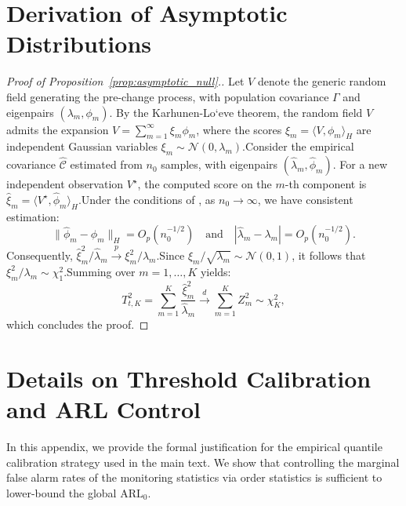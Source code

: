 \documentclass{article}
\theoremstyle{plain}
\theoremstyle{definition}
\theoremstyle{remark}
\begin{document}
\section{Derivation of Asymptotic Distributions}\label{app:proofs_Asy}
\begin{proof}[Proof of Proposition~\ref{prop:asymptotic_null}.]
Let $V$ denote the generic random field generating the pre-change process, with population covariance $\Gamma$ and eigenpairs $(\lambda_m, \phi_m)$.
By the Karhunen-Lo`eve theorem, the random field $V$ admits the expansion $V = \sum_{m=1}^\infty \xi_m \phi_m$, where the scores $\xi_m = \langle V, \phi_m \rangle_H$ are independent Gaussian variables $\xi_m \sim \mathcal{N}(0, \lambda_m)$.Consider the empirical covariance $\widehat{\mathcal{C}}$ estimated from $n_0$ samples, with eigenpairs $(\widehat{\lambda}_m, \widehat{\phi}_m)$. For a new independent observation $V^\star$, the computed score on the $m$-th component is $\widehat{\xi}_m = \langle V^\star, \widehat{\phi}_m \rangle_H$.Under the conditions of \citet{hall2006properties}, as $n_0 \to \infty$, we have consistent estimation:$$\| \widehat{\phi}_m - \phi_m \|_H = O_p(n_0^{-1/2}) \quad \text{and} \quad |\widehat{\lambda}_m - \lambda_m| = O_p(n_0^{-1/2}).$$Consequently, $\widehat{\xi}_m^2 / \widehat{\lambda}_m \xrightarrow{p} \xi_m^2 / \lambda_m$.Since $\xi_m / \sqrt{\lambda_m} \sim \mathcal{N}(0,1)$, it follows that $\xi_m^2 / \lambda_m \sim \chi^2_1$.Summing over $m=1, \dots, K$ yields:$$T_{t,K}^2 = \sum_{m=1}^K \frac{\widehat{\xi}_m^2}{\widehat{\lambda}_m} \xrightarrow{d} \sum_{m=1}^K Z_m^2 \sim \chi^2_K,$$which concludes the proof.
\end{proof}


\section{Details on Threshold Calibration and ARL Control}
\label{app:calibration}

In this appendix, we provide the formal justification for the empirical quantile calibration strategy used in the main text. We show that controlling the marginal false alarm rates of the monitoring statistics via order statistics is sufficient to lower-bound the global $\mathrm{ARL}_0$.
\end{document}

